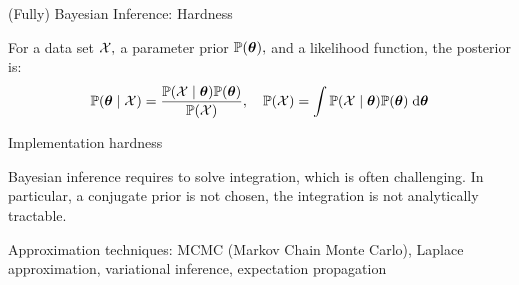 \documentclass[handout,fleqn,aspectratio=169]{beamer}
\begin{document}
\begin{frame}{(Fully) Bayesian Inference: Hardness}

\plitemsep 0.2in

\bci 



\item For a data set $\mathcal X,$ a parameter prior $\mathbb{P}( \bm{\theta} ),$ and a likelihood function, the posterior is:
$$
\mathbb{P}( \bm{\theta} \mid \mathcal X ) = \frac{\mathbb{P}( \mathcal X \mid \bm{\theta} ) \mathbb{P}( \bm{\theta} )}{\mathbb{P}( \mathcal X )}, \quad 
\mathbb{P}( \mathcal X ) = \int \mathbb{P}( \mathcal X \mid \bm{\theta} ) \mathbb{P}( \bm{\theta} ) \; \text{d}\bm{\theta}
$$


\item Implementation hardness
\bci
\item Bayesian inference requires to solve integration, which is often challenging. In particular, a conjugate prior is not chosen, the integration is not analytically tractable.

\item Approximation techniques: MCMC (Markov Chain Monte Carlo), Laplace approximation, variational inference, expectation propagation
\eci
\eci
\end{frame}
\end{document}
